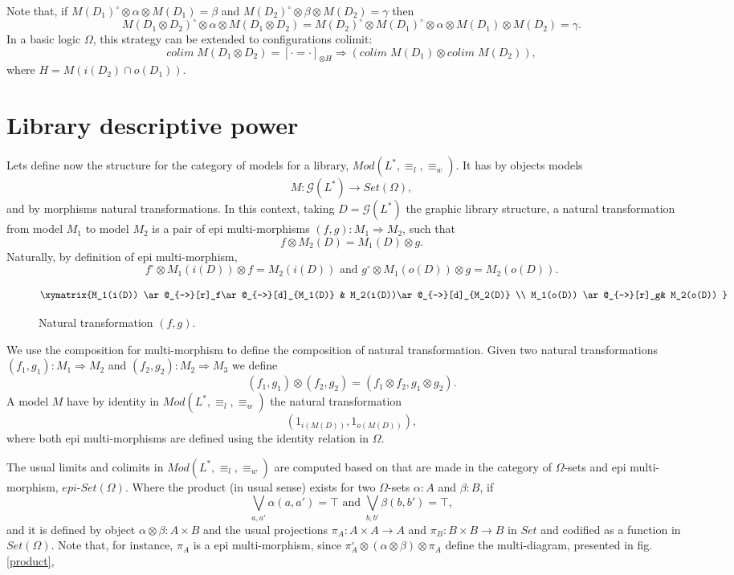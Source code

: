 \documentclass[oribibl]{llncs}
\newcommand{\G}{\mathcal{G}}
\begin{document}
Note that, if $M(D_1)^\circ\otimes\alpha\otimes M(D_1)=\beta$ and $M(D_2)^\circ\otimes\beta\otimes M(D_2)=\gamma$ then \[M(D_1\otimes D_2)^\circ\otimes\alpha\otimes M(D_1\otimes D_2)=M(D_2)^\circ\otimes M(D_1)^\circ\otimes\alpha\otimes M(D_1)\otimes M(D_2)=\gamma.\]
In a basic logic $\Omega$, this strategy can be extended to configurations colimit:
\[colim\; M(D_1\otimes D_2)=[\cdot=\cdot]_{\otimes H}\Rightarrow (colim\;M(D_1)\otimes colim\;M(D_2)),\]
where $H=M(i(D_2)\cap o(D_1))$.

\section{Library descriptive power}\label{descritive power}

Lets define now the structure for the category of models for a library, $Mod(L^\ast,\equiv_l,\equiv_w)$. It has by objects models \[M:\G(L^\ast)\rightarrow Set(\Omega),\]
and by morphisms natural transformations. In this context, taking $D=\G(L^\ast)$ the graphic library structure, a natural transformation from model $M_1$ to model $M_2$ is a pair of epi multi-morphisms $(f,g):M_1\Rightarrow M_2$, such that
\[ f \otimes M_2(D)= M_1(D)\otimes g.\]
Naturally, by definition of epi multi-morphism,  \[f^\circ\otimes M_1(i(D))\otimes f=M_2(i(D))\text{ and }g^\circ\otimes M_1(o(D))\otimes g=M_2(o(D)).\]

\begin{figure}[h]
\[
\xymatrix{M_1(i(D)) \ar@_{->}[r]_f\ar@_{->}[d]_{M_1(D)} & M_2(i(D))\ar@_{->}[d]_{M_2(D)} \\
          M_1(o(D)) \ar@_{->}[r]_g& M_2(o(D))
          }
\]
\caption{Natural transformation $(f,g)$.}\label{naturaltransf}
\end{figure}

 We use the composition for multi-morphism to define the composition of natural transformation. Given two natural transformations $(f_1,g_1):M_1\Rightarrow M_2$ and $(f_2,g_2):M_2\Rightarrow M_3$ we define
\[
(f_1,g_1)\otimes (f_2,g_2)=(f_1\otimes f_2,g_1\otimes g_2).
\]
A model $M$ have by identity in $Mod(L^\ast,\equiv_l,\equiv_w)$ the natural transformation \[(1_{i(M(D))},1_{o(M(D))}),\] where both epi multi-morphisms are defined using the identity relation in $\Omega$.

The usual limits and colimits in $Mod(L^\ast,\equiv_l,\equiv_w)$ are computed based on that are made in the category of $\Omega$-sets and epi multi-morphism, $epi$-$Set(\Omega)$. Where the product (in usual sense) exists for two $\Omega$-sets $\alpha:A$ and $\beta:B$, if
\[\bigvee_{a,a'}\alpha(a,a')=\top \text{ and } \bigvee_{b,b'}\beta(b,b')=\top,\]and it is defined by object $\alpha\otimes\beta:A\times B$ and the usual projections $\pi_A:A\times A\rightarrow A$ and $\pi_B:B\times B\rightarrow B$ in $Set$ and codified as a function in $Set(\Omega)$. Note that, for instance, $\pi_A$ is a epi multi-morphism, since $\pi_A^\circ\otimes(\alpha\otimes\beta)\otimes \pi_A$ define the multi-diagram, presented in fig. \ref{product},
\end{document}
